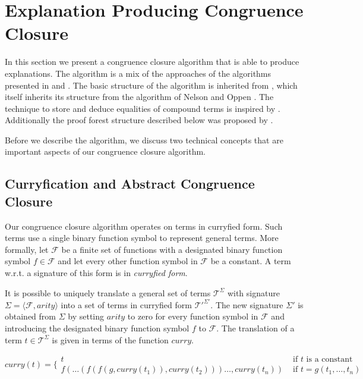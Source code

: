\section{Explanation Producing Congruence Closure}
\label{sec:algorithm}
%
In this section we present a congruence closure algorithm that is able to produce explanations.
The algorithm is a mix of the approaches of the algorithms presented in \cite{Fontaine2004} and \cite{Nieuwenhuis2005,Nieuwenhuis2007}.
The basic structure of the algorithm is inherited from \cite{Fontaine2004}, which itself inherits its structure from the algorithm of Nelson and Oppen \cite{Nelson1980}.
The technique to store and deduce equalities of compound terms is inspired by \cite{Nieuwenhuis2005,Nieuwenhuis2007}.
Additionally the proof forest structure described below was proposed by \cite{Nieuwenhuis2005,Nieuwenhuis2007}.

Before we describe the algorithm, we discuss two technical concepts that are important aspects of our congruence closure algorithm.

\subsection*{Curryfication and Abstract Congruence Closure}
\label{subsec:algorithms_preliminaries}

Our congruence closure algorithm operates on terms in curryfied form.
Such terms use a single binary function symbol to represent general terms.
More formally, let $\mathcal{F}$ be a finite set of functions with a designated binary function symbol $f \in \mathcal{F}$ and let every other function symbol in $\mathcal{F}$ be a constant.
A term w.r.t. a signature of this form is in \emph{curryfied form}.

It is possible to uniquely translate a general set of terms $\mathcal{T}^{\Sigma}$ with signature $\Sigma = \langle \mathcal{F},arity \rangle$ into a set of terms in curryfied form $\mathcal{T'}^{\Sigma'}$.
The new signature $\Sigma'$ is obtained from $\Sigma$ by setting $arity$ to zero for every function symbol in $\mathcal{F}$ and introducing the designated binary function symbol $f$ to $\mathcal{F}$.
The translation of a term $t \in \mathcal{T}^{\Sigma}$ is given in terms of the function $curry$.

$$
curry(t) = \Big\{
\begin{array}{ll}
	t & \text{ if } t \text{ is a constant }\\
	f(\ldots (f(f(g,curry(t_1)),curry(t_2)))\ldots,curry(t_n)) &\text{ if } t = g(t_1,\ldots, t_n)
\end{array}
$$

